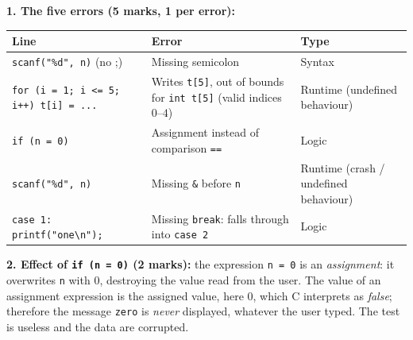 \documentclass[11pt]{article}
\begin{document}
\begin{corrige}
\textbf{1. The five errors (5 marks, 1 per error):}
\begin{center}
\begin{tabularx}{\linewidth}{|l|X|X|}
\hline
\rowcolor{popblueL} Line & Error & Type \\
\hline
\texttt{scanf("\%d", n)} (no ;) & Missing semicolon & Syntax \\
\hline
\texttt{for (i = 1; i <= 5; i++) t[i] = ...} & Writes \texttt{t[5]}, out of bounds for \texttt{int t[5]} (valid indices $0$--$4$) & Runtime (undefined behaviour) \\
\hline
\texttt{if (n = 0)} & Assignment instead of comparison \texttt{==} & Logic \\
\hline
\texttt{scanf("\%d", n)} & Missing \texttt{\&} before \texttt{n} & Runtime (crash / undefined behaviour) \\
\hline
\texttt{case 1: printf("one\textbackslash n");} & Missing \texttt{break}: falls through into \texttt{case 2} & Logic \\
\hline
\end{tabularx}
\end{center}

\textbf{2. Effect of \texttt{if (n = 0)} (2 marks):} the expression \texttt{n = 0} is an \emph{assignment}: it overwrites \texttt{n} with $0$, destroying the value read from the user. The value of an assignment expression is the assigned value, here $0$, which C interprets as \emph{false}; therefore the message \texttt{zero} is \emph{never} displayed, whatever the user typed. The test is useless and the data are corrupted.


\end{corrige}
\end{document}
